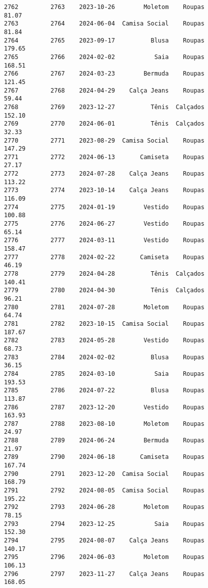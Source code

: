 \documentclass[11pt]{article}
\begin{document}
\begin{Verbatim}[commandchars=\\\{\}]
2762         2763    2023-10-26        Moletom    Roupas           81.07   
2763         2764    2024-06-04  Camisa Social    Roupas           81.84   
2764         2765    2023-09-17          Blusa    Roupas          179.65   
2765         2766    2024-02-02           Saia    Roupas          168.51   
2766         2767    2024-03-23        Bermuda    Roupas          121.45   
2767         2768    2024-04-29    Calça Jeans    Roupas           59.44   
2768         2769    2023-12-27          Tênis  Calçados          152.10   
2769         2770    2024-06-01          Tênis  Calçados           32.33   
2770         2771    2023-08-29  Camisa Social    Roupas          147.29   
2771         2772    2024-06-13       Camiseta    Roupas           27.17   
2772         2773    2024-07-28    Calça Jeans    Roupas          113.22   
2773         2774    2023-10-14    Calça Jeans    Roupas          116.09   
2774         2775    2024-01-19        Vestido    Roupas          100.88   
2775         2776    2024-06-27        Vestido    Roupas           65.14   
2776         2777    2024-03-11        Vestido    Roupas          158.47   
2777         2778    2024-02-22       Camiseta    Roupas           46.19   
2778         2779    2024-04-28          Tênis  Calçados          140.41   
2779         2780    2024-04-30          Tênis  Calçados           96.21   
2780         2781    2024-07-28        Moletom    Roupas           64.74   
2781         2782    2023-10-15  Camisa Social    Roupas          187.67   
2782         2783    2024-05-28        Vestido    Roupas           68.73   
2783         2784    2024-02-02          Blusa    Roupas           36.15   
2784         2785    2024-03-10           Saia    Roupas          193.53   
2785         2786    2024-07-22          Blusa    Roupas          113.87   
2786         2787    2023-12-20        Vestido    Roupas          163.93   
2787         2788    2023-08-10        Moletom    Roupas           24.97   
2788         2789    2024-06-24        Bermuda    Roupas           21.97   
2789         2790    2024-06-18       Camiseta    Roupas          167.74   
2790         2791    2023-12-20  Camisa Social    Roupas          168.79   
2791         2792    2024-08-05  Camisa Social    Roupas          195.22   
2792         2793    2024-06-28        Moletom    Roupas           78.15   
2793         2794    2023-12-25           Saia    Roupas          152.30   
2794         2795    2024-08-07    Calça Jeans    Roupas          140.17   
2795         2796    2024-06-03        Moletom    Roupas          106.13   
2796         2797    2023-11-27    Calça Jeans    Roupas          168.05   

\end{Verbatim}
\end{document}

